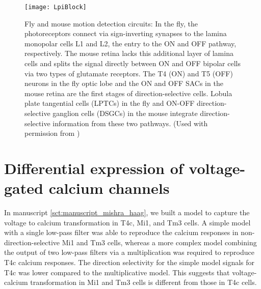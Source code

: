 \begin{figure}
\centering
\hspace*{-1cm} 
\texttt{[image: LpiBlock]}
\caption[LPi Neurons Convey Null Direction Responses to Tangential Cells] {Fly and mouse motion detection circuits: In the fly, the photoreceptors connect via sign-inverting synapses to the lamina monopolar cells L1 and L2, the entry to the ON and OFF pathway, respectively. The mouse retina lacks this additional layer of lamina cells and splits the signal directly between ON and OFF bipolar cells via two types of glutamate receptors. The T4 (ON) and T5 (OFF) neurons in the fly optic lobe and the ON and OFF SACs in the mouse retina are the first stages of direction-selective cells. Lobula plate tangential cells (LPTCs) in the fly and ON-OFF direction-selective ganglion cells (DSGCs) in the mouse integrate direction-selective information from these two pathways. (Used with permission from \cite{Borst2015})} 
\label{fig:lpiblock}
\end{figure}

\section{Differential expression of voltage-gated calcium channels}

In manuscript \ref{sct:manuscript_mishra_haag}, we built a model to capture the voltage to calcium transformation in T4c, Mi1, and Tm3 cells. A simple model with a single low-pass filter was able to reproduce the calcium responses in non-direction-selective Mi1 and Tm3 cells, whereas a more complex model combining the output of two low-pass filters via a multiplication was required to reproduce T4c calcium responses. The direction selectivity for the simple model signals for T4c was lower compared to the multiplicative model. This suggests that voltage-calcium transformation in Mi1 and Tm3 cells is different from those in T4c cells. 

